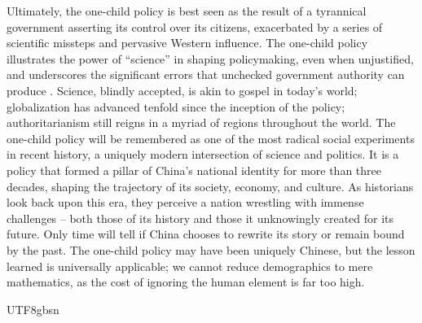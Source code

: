 \documentclass[12pt, a4paper, twoside]{article}
\begin{document}
Ultimately, the one-child policy is best seen as the result of a tyrannical government asserting its control over its citizens, exacerbated by a series of scientific missteps and pervasive Western influence. The one-child policy illustrates the power of “science” in shaping policymaking, even when unjustified, and underscores the significant errors that unchecked government authority can produce \autocite[p.\ 343]{Greenhalgh2008JustOneChild}. Science, blindly accepted, is akin to gospel in today’s world; globalization has advanced tenfold since the inception of the policy; authoritarianism still reigns in a myriad of regions throughout the world. The one-child policy will be remembered as one of the most radical social experiments in recent history, a uniquely modern intersection of science and politics. It is a policy that formed a pillar of China’s national identity for more than three decades, shaping the trajectory of its society, economy, and culture. As historians look back upon this era, they perceive a nation wrestling with immense challenges – both those of its history and those it unknowingly created for its future. Only time will tell if China chooses to rewrite its story or remain bound by the past. The one-child policy may have been uniquely Chinese, but the lesson learned is universally applicable; we cannot reduce demographics to mere mathematics, as the cost of ignoring the human element is far too high.



\begin{CJK}{UTF8}{gbsn}
\nocite{*}
\printbibliography
\end{CJK}
\end{document}
